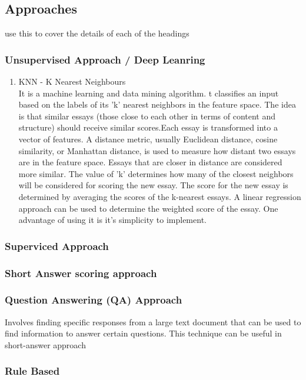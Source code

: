 \documentclass{article}
\begin{document}
\subsection{Approaches}
\cite{12_tarandeep2019} use this to cover the details of each of the headings
\subsubsection{Unsupervised Approach / Deep Leanring}
\begin{enumerate}
    \item KNN - K Nearest Neighbours \\ It is a machine learning and data mining algorithm. t classifies an input based on the labels of its 'k' nearest neighbors in the feature space. The idea is that similar essays (those close to each other in terms of content and structure) should receive similar scores.Each essay is transformed into a vector of features. A distance metric, usually Euclidean distance, cosine similarity, or Manhattan distance, is used to measure how distant two essays are in the feature space. Essays that are closer in distance are considered more similar. The value of 'k' determines how many of the closest neighbors will be considered for scoring the new essay. The score for the new essay is determined by averaging the scores of the k-nearest essays. A linear regression approach can be used to determine the weighted score of the essay. One advantage of using it is it's simplicity to implement.
\end{enumerate}
\subsubsection{Superviced Approach}
\subsubsection{Short Answer scoring approach}
\subsubsection{Question Answering (QA) Approach}
Involves finding specific responses from a large text document that can be used to find information to answer certain questions. This technique can be useful in short-answer approach
\subsubsection{Rule Based}
\end{document}
